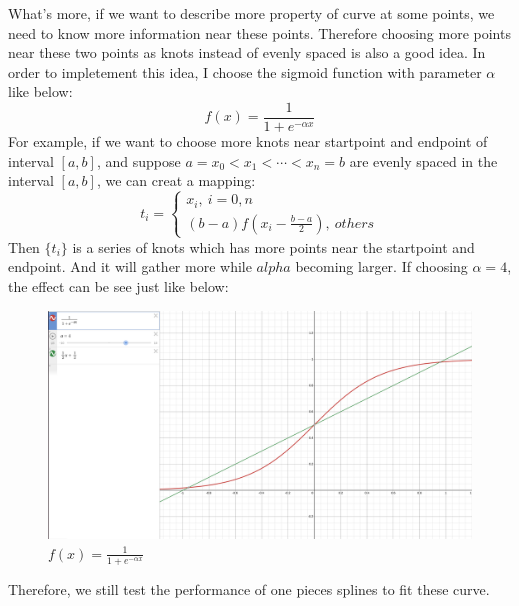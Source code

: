 \documentclass{article}
\begin{document}
What's more, if we want to describe more property of curve at some points, we need to know more information near these points. Therefore choosing more points near these two points as knots instead of evenly spaced is also a good idea. In order to impletement this idea, I choose the sigmoid function with parameter $\alpha$ like below:
$$f(x)=\frac{1}{1+e^{-\alpha x}}$$
For example, if we want to choose more knots near startpoint and endpoint of interval $[a,b]$, and suppose $a=x_0<x_1<\cdots<x_n=b$ are evenly spaced in the interval $[a,b]$, we can creat a mapping:
$$ t_i=
\begin{cases}
    x_i,\ i = 0, n\\
    (b-a)f(x_i-\frac{b-a}{2}),\ others
\end{cases}
$$
Then $\{t_i\}$ is a series of knots which has more points near the startpoint and endpoint. And it will gather more while $alpha$ becoming larger. If choosing $\alpha=4$, the effect can be see just like below:
\begin{figure}[h]
    \centering
    \includegraphics[width=0.7\linewidth]{sigmoid.png}
    \caption{$f(x)=\frac{1}{1+e^{-\alpha x}}$}
\end{figure}

\newpage
Therefore, we still test the performance of one pieces splines to fit these curve.
\end{document}
